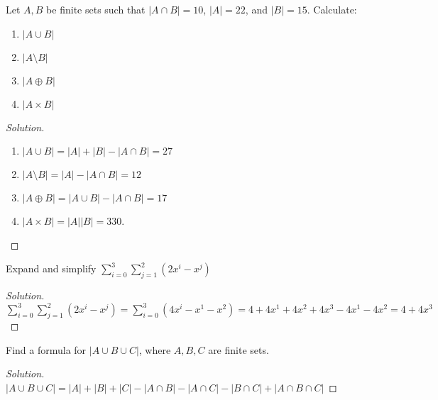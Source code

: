     \begin{problem}
    Let $A,B$ be finite sets such that $|A\cap B| =10$, $|A| = 22$, and $|B| = 15$. Calculate:
    \begin{enumerate}
        \item $|A\cup B|$
        \item $|A\setminus B|$
        \item $|A\oplus B|$
        \item $|A\times B|$
    \end{enumerate}
    \end{problem}
    \begin{proof}[Solution]
        \par
        \begin{enumerate}
            \item $|A\cup B| = |A|+|B|-|A\cap B| = 27$
            \item $|A\setminus B| = |A|-|A\cap B| = 12$
            \item $|A\oplus B| = |A\cup B|-|A\cap B| = 17$
            \item $|A\times B| = |A||B| = 330$.
        \end{enumerate}
    \end{proof}
    \begin{problem}
    Expand and simplify $\sum_{i=0}^{3}\sum_{j=1}^{2}(2x^i-x^j)$
    \end{problem}
    \begin{proof}[Solution]
    \vspace{-0.5\topsep}
    $\sum_{i=0}^{3}\sum_{j=1}^{2}(2x^i-x^j)=\sum_{i=0}^{3}(4x^{i}-x^{1}-x^{2})=4+4x^{1}+4x^{2}+4x^{3}-4x^{1}-4x^{2}=4+4x^3$
    \end{proof}
    \begin{problem}
    Find a formula for $|A\cup B\cup C|$, where $A,B,C$ are finite sets.
    \end{problem}
    \begin{proof}[Solution]
    \vspace{-0.5\topsep}
    $|A\cup B\cup C| = |A|+|B|+|C|-|A\cap B|-|A\cap C|-|B\cap C| +|A\cap B \cap C|$
    \end{proof}
